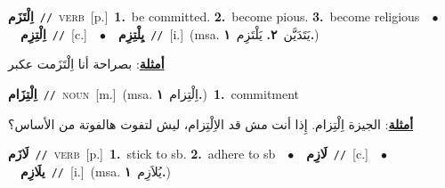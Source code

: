 \documentclass[10pt,a4paper,twoside]{article} %
\begin{document}
\begin{multicols}{2}
{\setlength\topsep{0pt}\textbf{\foreignlanguage{arabic}{اِلْتَزَم}}\ {\color{gray}\texttt{//}\color{black}}\ \textsc{verb}\ [p.]\ \textbf{1.}~be committed.  \textbf{2.}~become pious.  \textbf{3.}~become religious\ \ $\bullet$\ \ \setlength\topsep{0pt}\textbf{\foreignlanguage{arabic}{اِلْتِزِم}}\ {\color{gray}\texttt{//}\color{black}}\ [c.]\ \ $\bullet$\ \ \setlength\topsep{0pt}\textbf{\foreignlanguage{arabic}{يِلْتِزِم}}\ {\color{gray}\texttt{//}\color{black}}\ [i.]\ \color{gray}(msa. \foreignlanguage{arabic}{يَتَدَيَّن}~\foreignlanguage{arabic}{\textbf{٢.}}  \foreignlanguage{arabic}{يَلْتَزِم}~\foreignlanguage{arabic}{\textbf{١.}})\color{black}\  \begin{flushright}\color{gray}\foreignlanguage{arabic}{\textbf{\underline{\foreignlanguage{arabic}{أمثلة}}}: بصراحة أنا اِلْتَزَمت عكبر}\end{flushright}\color{black}} \vspace{2mm}

{\setlength\topsep{0pt}\textbf{\foreignlanguage{arabic}{اِلْتِزَام}}\ {\color{gray}\texttt{//}\color{black}}\ \textsc{noun}\ [m.]\ \color{gray}(msa. \foreignlanguage{arabic}{اِلْتِزام}~\foreignlanguage{arabic}{\textbf{١.}})\color{black}\ \textbf{1.}~commitment\  \begin{flushright}\color{gray}\foreignlanguage{arabic}{\textbf{\underline{\foreignlanguage{arabic}{أمثلة}}}: الجيزة اِلْتِزام. إِذا أنت مش قد الاِلْتِزام، ليش لتفوت هالفوتة من الأساس؟}\end{flushright}\color{black}} \vspace{2mm}

{\setlength\topsep{0pt}\textbf{\foreignlanguage{arabic}{لَازَم}}\ {\color{gray}\texttt{//}\color{black}}\ \textsc{verb}\ [p.]\ \textbf{1.}~stick to sb.  \textbf{2.}~adhere to sb\ \ $\bullet$\ \ \setlength\topsep{0pt}\textbf{\foreignlanguage{arabic}{لَازِم}}\ {\color{gray}\texttt{//}\color{black}}\ [c.]\ \ $\bullet$\ \ \setlength\topsep{0pt}\textbf{\foreignlanguage{arabic}{يلَازِم}}\ {\color{gray}\texttt{//}\color{black}}\ [i.]\ \color{gray}(msa. \foreignlanguage{arabic}{يُلاَزِم}~\foreignlanguage{arabic}{\textbf{١.}})\color{black}\ } \vspace{2mm}


\end{multicols}
\end{document}
